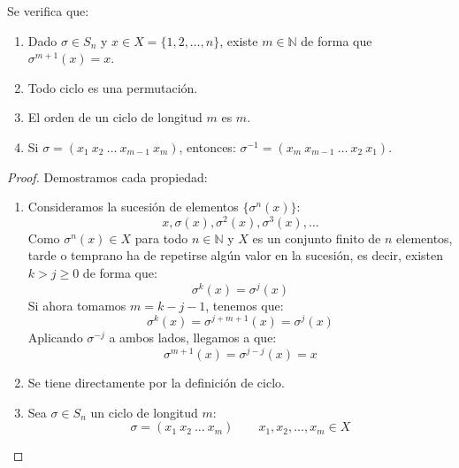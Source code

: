 \begin{prop}\label{prop:propiedades_sn}
    Se verifica que:
    \begin{enumerate}
        \item Dado $\sigma\in S_n$ y $x\in X=\{1,2,\ldots,n\}$, existe $m\in \mathbb{N}$ de forma que $\sigma^{m+1}(x)=x$.
        \item Todo ciclo es una permutación.
        \item El orden de un ciclo de longitud $m$ es $m$.
        \item Si $\sigma = (x_1\ x_2\ \ldots\ x_{m-1}\ x_m)$, entonces: $\sigma^{-1} = (x_m\ x_{m-1}\ \ldots\ x_2\ x_1)$.
    \end{enumerate}
    \begin{proof}
        Demostramos cada propiedad:
        \begin{enumerate}
            \item Consideramos la sucesión de elementos $\{\sigma^n(x)\}$:
                \begin{equation*}
                    x,\sigma(x),\sigma^2(x),\sigma^3(x),\ldots
                \end{equation*}
                Como $\sigma^n(x)\in X$ para todo $n\in \mathbb{N}$ y $X$ es un conjunto finito de $n$ elementos, tarde o temprano ha de repetirse algún valor en la sucesión, es decir, existen $k>j\geq 0$ de forma que:
                \begin{equation*}
                    \sigma^k(x) = \sigma^j(x)
                \end{equation*}
                Si ahora tomamos $m=k-j-1$, tenemos que:
                \begin{equation*}
                    \sigma^k(x) = \sigma^{j+m+1}(x) = \sigma^j(x)
                \end{equation*}
                Aplicando $\sigma^{-j}$ a ambos lados, llegamos a que:
                \begin{equation*}
                    \sigma^{m+1}(x) = \sigma^{j-j}(x) = x
                \end{equation*}
            \item Se tiene directamente por la definición de ciclo.
            \item Sea $\sigma\in S_n$ un ciclo de longitud $m$:
                \begin{equation*}
                    \sigma = (x_1\ x_2\ \ldots\ x_m) \qquad x_1,x_2,\ldots,x_m \in X
                \end{equation*}

\end{enumerate}
\end{proof}
\end{prop}
